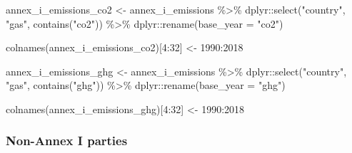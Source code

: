 \documentclass[
  12pt,
]{article}
\newenvironment{Shaded}{}{}
\newcommand{\AttributeTok}[1]{\textcolor[rgb]{0.49,0.56,0.16}{#1}}
\newcommand{\DecValTok}[1]{\textcolor[rgb]{0.25,0.63,0.44}{#1}}
\newcommand{\FunctionTok}[1]{\textcolor[rgb]{0.02,0.16,0.49}{#1}}
\newcommand{\NormalTok}[1]{#1}
\newcommand{\OtherTok}[1]{\textcolor[rgb]{0.00,0.44,0.13}{#1}}
\newcommand{\SpecialCharTok}[1]{\textcolor[rgb]{0.25,0.44,0.63}{#1}}
\newcommand{\StringTok}[1]{\textcolor[rgb]{0.25,0.44,0.63}{#1}}
\begin{document}
\begin{Shaded}
\begin{Highlighting}[]
\NormalTok{annex\_i\_emissions\_co2 }\OtherTok{\textless{}{-}}\NormalTok{ annex\_i\_emissions }\SpecialCharTok{\%\textgreater{}\%}
\NormalTok{    dplyr}\SpecialCharTok{::}\FunctionTok{select}\NormalTok{(}\StringTok{"country"}\NormalTok{, }\StringTok{"gas"}\NormalTok{, }\FunctionTok{contains}\NormalTok{(}\StringTok{"co2"}\NormalTok{)) }\SpecialCharTok{\%\textgreater{}\%}
\NormalTok{    dplyr}\SpecialCharTok{::}\FunctionTok{rename}\NormalTok{(}\AttributeTok{base\_year =} \StringTok{"co2"}\NormalTok{)}

\FunctionTok{colnames}\NormalTok{(annex\_i\_emissions\_co2)[}\DecValTok{4}\SpecialCharTok{:}\DecValTok{32}\NormalTok{] }\OtherTok{\textless{}{-}} \DecValTok{1990}\SpecialCharTok{:}\DecValTok{2018}

\NormalTok{annex\_i\_emissions\_ghg }\OtherTok{\textless{}{-}}\NormalTok{ annex\_i\_emissions }\SpecialCharTok{\%\textgreater{}\%}
\NormalTok{    dplyr}\SpecialCharTok{::}\FunctionTok{select}\NormalTok{(}\StringTok{"country"}\NormalTok{, }\StringTok{"gas"}\NormalTok{, }\FunctionTok{contains}\NormalTok{(}\StringTok{"ghg"}\NormalTok{)) }\SpecialCharTok{\%\textgreater{}\%}
\NormalTok{    dplyr}\SpecialCharTok{::}\FunctionTok{rename}\NormalTok{(}\AttributeTok{base\_year =} \StringTok{"ghg"}\NormalTok{)}

\FunctionTok{colnames}\NormalTok{(annex\_i\_emissions\_ghg)[}\DecValTok{4}\SpecialCharTok{:}\DecValTok{32}\NormalTok{] }\OtherTok{\textless{}{-}} \DecValTok{1990}\SpecialCharTok{:}\DecValTok{2018}
\end{Highlighting}
\end{Shaded}

\hypertarget{non-annex-i-parties-2}{%
\subsubsection{Non-Annex I parties}\label{non-annex-i-parties-2}}
\end{document}
